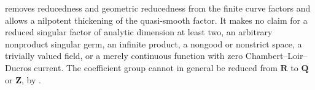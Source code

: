 \begin{remark}
\label{rem:p061-arbitrary-curve-factors-firewall}
 removes reducedness and
geometric reducedness from the finite curve factors and allows a nilpotent
thickening of the quasi-smooth factor.  It makes no claim for a reduced
singular factor of analytic dimension at least two, an arbitrary
nonproduct singular germ, an infinite product, a nongood or nonstrict
space, a trivially valued field, or a merely continuous function with zero
Chambert--Loir--Ducros current.  The coefficient group cannot in general be
reduced from \(\mathbf R\) to \(\mathbf Q\) or \(\mathbf Z\), by
.
\end{remark}
